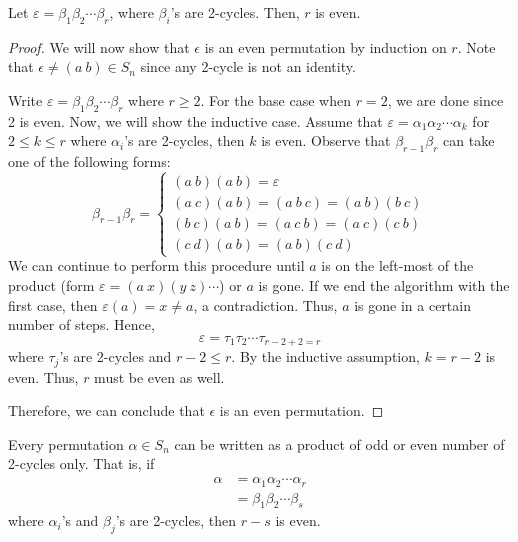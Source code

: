\begin{lemma}
    Let \(\varepsilon = \beta_1 \beta_2 \cdots \beta_r\), where \(\beta_i\)'s are 2-cycles. Then, \(r\) is even.
\end{lemma}

\begin{proof}
    We will now show that \(\epsilon\) is an even permutation by induction on \(r\). Note that \(\epsilon \neq (a\ b) \in S_n\) since any 2-cycle is not an identity.

    Write \(\varepsilon = \beta_1 \beta_2 \cdots \beta_{r}\) where \(r \geq 2\). For the base case when \(r=2\), we are done since 2 is even. Now, we will show the inductive case. Assume that \(\varepsilon = \alpha_1 \alpha_2 \cdots \alpha_k\) for \(2 \leq k \leq r\) where \(\alpha_i\)'s are 2-cycles, then \(k\) is even. Observe that \(\beta_{r-1} \beta_r\) can take one of the following forms:
    \[
        \beta_{r-1} \beta_{r} = \begin{cases}
            (a\ b)(a\ b) = \varepsilon \\
            (a\ c)(a\ b) = (a\ b\ c) = (a\ b)(b\ c) \\
            (b\ c)(a\ b) = (a\ c\ b) = (a\ c)(c\ b) \\
            (c\ d)(a\ b) = (a\ b)(c\ d)
        \end{cases}
    \]
    We can continue to perform this procedure until \(a\) is on the left-most of the product (form \(\varepsilon = (a\ x)(y\ z)\cdots\)) or \(a\) is gone. If we end the algorithm with the first case, then \(\varepsilon(a) = x \neq a\), a contradiction. Thus, \(a\) is gone in a certain number of steps. Hence, 
    \[
        \varepsilon = \tau_1 \tau_2 \cdots \tau_{r-2+2=r}
    \]
    where \(\tau_j\)'s are 2-cycles and \(r-2 \leq r\). By the inductive assumption, \(k=r-2\) is even. Thus, \(r\) must be even as well.

    Therefore, we can conclude that \(\epsilon\) is an even permutation.
\end{proof}

\begin{theorem}\label{thm:five-five}
    Every permutation \(\alpha \in S_n\) can be written as a product of odd or even number of 2-cycles only. That is, if
    \[
    \begin{aligned}
        \alpha &= \alpha_1 \alpha_2 \cdots \alpha_r \\
               &= \beta_1 \beta_2 \cdots \beta_s
    \end{aligned}
    \]
    where \(\alpha_i\)'s and \(\beta_j\)'s are 2-cycles, then \(r-s\) is even.
\end{theorem}

